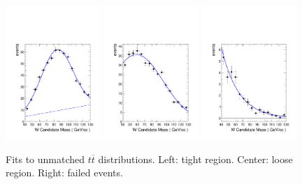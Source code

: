 \begin{figure}[h!]
\centering
                \includegraphics[width=0.32\textwidth]{figs/WtagSF/UT.pdf}
                \includegraphics[width=0.32\textwidth]{figs/WtagSF/UL.pdf}
                \includegraphics[width=0.32\textwidth]{figs/WtagSF/UF.pdf}
\caption{Fits to unmatched $t\overline{t}$ distributions. Left: tight region. Center: loose region. Right: failed events.}\label{fig:fitsunmatched}
\end{figure}

